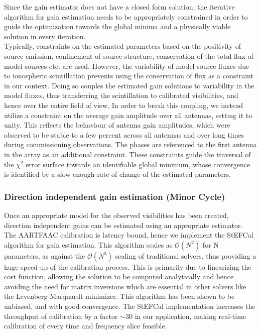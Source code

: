 \documentclass{aa}
\begin{document}
Since the  gain estimator does  not have a  closed form solution,  the iterative
algorithm for gain estimation needs  to be appropriately constrained in order to
guide  the  optimization towards  the  global  minima  and a  physically  viable
solution in every iteration.\\

Typically, constraints  on the estimated  parameters based on the  positivity of
source emission, confinement of source structure, conservation of the total flux
of model sources etc. are used.  However, the variability of model source fluxes
due to  ionospheric scintillation prevents using  the conservation of  flux as a
constraint  in our context.  Doing so  couples the  estimated gain  solutions to
variability  in  the  model  fluxes,  thus  transferring  the  scintillation  to
calibrated visibilities, and  hence over the entire field of  view.  In order to
break  this  coupling, we  instead  utilize a  constraint  on  the average  gain
amplitude over all antennas, setting it to unity. This reflects the behaviour of
antenna  gain amplitudes,  which were  observed to  be stable  to a  few percent
across all antennas and over  long times during commissioning observations.  The
phases  are referenced  to  the first  antenna  in the  array  as an  additional
constraint.  These  constraints guide  the  traversal  of  the $\chi^{2}$  error
surface towards an identifiable  global minimum, whose convergence is identified
by a slow enough rate of change of the estimated parameters.


\subsubsection{\label{sub:Direction-independent-gain}Direction independent gain
estimation (Minor Cycle)}

Once  an appropriate  model  for  the observed  visibilities  has been  created,
direction independent gains can be estimated using an appropriate estimator. The
AARTFAAC   calibration    is   latency    bound,   hence   we    implement   the
StEFCal\citep{salvini2013stef}  algorithm for  gain estimation.   This algorithm
scales   as   $\mathcal{O}(N^{2})$   for    N   parameters,   as   against   the
$\mathcal{O}(N^{3})$  scaling  of traditional  solvers,  thus  providing a  huge
speed-up of the  calibration process.  This is primarily  due to linearizing the
cost  function, allowing  the solution  to  be computed  analytically and  hence
avoiding the  need for  matrix inversions which  are essential in  other solvers
like  the Levenberg-Marquardt  minimizer. This  algorithm has  been shown  to be
unbiased, and  with good convergence.  The StEFCal implementation  increases the
throughput  of calibration  by  a  factor $\sim$30  in  our application,  making
real-time calibration of every time and frequency slice feasible.
\end{document}
